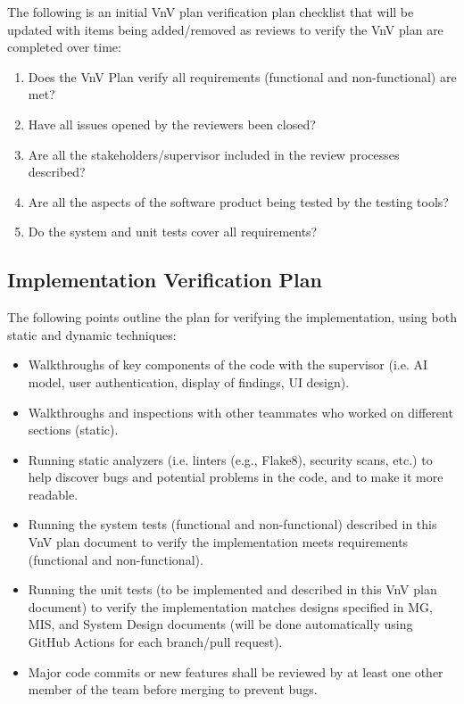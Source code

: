 \documentclass[12pt, titlepage]{article}
\begin{document}
\noindent The following is an initial VnV plan verification plan checklist that will be updated with items being added/removed as reviews to verify the VnV plan are completed over time:
\begin{enumerate}[label=$\square$]
    \item Does the VnV Plan verify all requirements (functional and non-functional) are met?
    \item Have all issues opened by the reviewers been closed?
    \item Are all the stakeholders/supervisor included in the review processes described?
    \item Are all the aspects of the software product being tested by the testing tools?
    \item Do the system and unit tests cover all requirements?
\end{enumerate}

\subsection{Implementation Verification Plan}
The following points outline the plan for verifying the implementation, using both static and dynamic techniques:
\begin{itemize}
    \item Walkthroughs of key components of the code with the supervisor (i.e. AI model, user authentication, display of findings, UI design).
    \item Walkthroughs and inspections with other teammates who worked on different sections (static).
    \item Running static analyzers (i.e. linters (e.g., Flake8), security scans,  etc.) to help discover bugs and potential problems in the code, and to make it more readable.
    \item Running the system tests (functional and non-functional) described in this VnV plan document to verify the implementation meets requirements (functional and non-functional).
    \item Running the unit tests (to be implemented and described in this VnV plan document) to verify the implementation matches designs specified in MG, MIS, and System Design documents (will be done automatically using GitHub Actions for each branch/pull request).
    \item Major code commits or new features shall be reviewed by at least one other member of the team before merging to prevent bugs.
\end{itemize}
\end{document}
